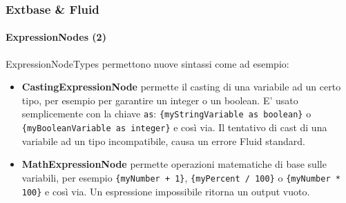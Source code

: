 
\begin{frame}[fragile]
	\frametitle{Extbase \& Fluid}
	\framesubtitle{ExpressionNodes (2)}

	ExpressionNodeTypes permettono nuove sintassi come ad esempio:

	\begin{itemize}

		\item \textbf{CastingExpressionNode}\newline
			\small
				permette il casting di una variabile ad un certo tipo, per esempio per garantire
				un integer o un boolean. E' usato semplicemente con la chiave \texttt{as}:
				\texttt{\{myStringVariable as boolean\}} o
				\texttt{\{myBooleanVariable as integer\}} e così via.
				Il tentativo di cast di una variabile ad un tipo incompatibile, causa un errore
				Fluid standard.
			\normalsize

		\item \textbf{MathExpressionNode}\newline
			\small
				permette operazioni matematiche di base sulle variabili, per esempio
				\texttt{\{myNumber + 1\}}, \texttt{\{myPercent / 100\}} o
				\texttt{\{myNumber * 100\}} e così via.
				Un espressione impossibile ritorna un output vuoto.
			\normalsize

	\end{itemize}

\end{frame}


